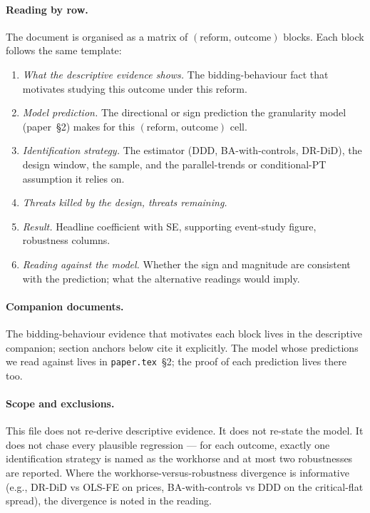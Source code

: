 \documentclass[11pt,a4paper]{article}
\newcommand{\code}[1]{\nolinkurl{#1}}
\begin{document}
\paragraph{Reading by row.} The document is organised as a matrix of $(\text{reform},\,\text{outcome})$ blocks. Each block follows the same template:

\begin{enumerate}
\item \emph{What the descriptive evidence shows.} The bidding-behaviour fact that motivates studying this outcome under this reform.
\item \emph{Model prediction.} The directional or sign prediction the granularity model (paper~\S2) makes for this $(\text{reform},\,\text{outcome})$ cell.
\item \emph{Identification strategy.} The estimator (DDD, BA-with-controls, DR-DiD), the design window, the sample, and the parallel-trends or conditional-PT assumption it relies on.
\item \emph{Threats killed by the design, threats remaining.}
\item \emph{Result.} Headline coefficient with SE, supporting event-study figure, robustness columns.
\item \emph{Reading against the model.} Whether the sign and magnitude are consistent with the prediction; what the alternative readings would imply.
\end{enumerate}

\paragraph{Companion documents.} The bidding-behaviour evidence that motivates each block lives in the descriptive companion; section anchors below cite it explicitly. The model whose predictions we read against lives in \code{paper.tex}~\S2; the proof of each prediction lives there too.

\paragraph{Scope and exclusions.} This file does not re-derive descriptive evidence. It does not re-state the model. It does not chase every plausible regression --- for each outcome, exactly one identification strategy is named as the workhorse and at most two robustnesses are reported. Where the workhorse-versus-robustness divergence is informative (e.g., DR-DiD vs OLS-FE on prices, BA-with-controls vs DDD on the critical-flat spread), the divergence is noted in the reading.
\end{document}
